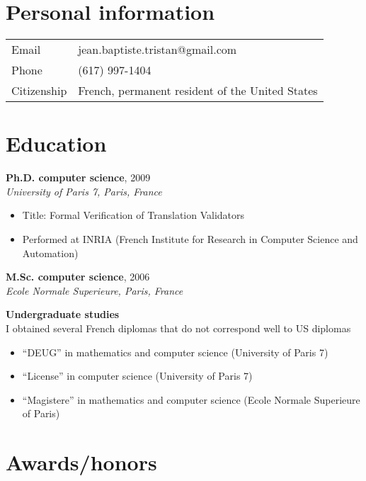 \documentclass[margin,line]{res}
\begin{document}

\begin{resume}


\section{\sc Personal information}
\vspace{.05in}
\begin{tabular}{@{}p{2in}p{4in}}
Email           & jean.baptiste.tristan@gmail.com \\            
Phone   & (617) 997-1404 \\         
Citizenship & French, permanent resident of the United States\\       
\end{tabular}

\section{\sc Education}
{\bf Ph.D. computer science}, 2009\\
{\em University of Paris 7, Paris, France} 
\begin{itemize}
  \item Title: Formal Verification of Translation Validators
  \item Performed at INRIA (French Institute for Research in Computer Science and Automation)
\end{itemize}

{\bf M.Sc. computer science}, 2006\\
{\em Ecole Normale Superieure, Paris, France} 

{\bf Undergraduate studies}\\
I obtained several French diplomas that do not correspond well to US diplomas
\begin{itemize}
\item ``DEUG'' in mathematics and computer science (University of Paris 7)
\item ``License'' in computer science (University of Paris 7)
\item ``Magistere'' in mathematics and computer science (Ecole Normale Superieure of Paris)
\end{itemize}

\section{\sc Awards/honors}


\end{resume}
\end{document}
